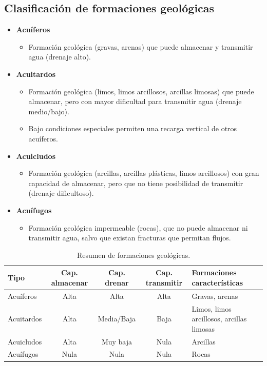 \subsection{Clasificación de formaciones geológicas}
\begin{itemize}
  \item \textbf{Acuíferos}
  \begin{itemize}
    \item Formación geológica (gravas, arenas) que puede almacenar y transmitir
          agua (drenaje alto).
  \end{itemize}
  \item \textbf{Acuitardos}
  \begin{itemize}
    \item Formación geológica (limos, limos arcillosos, arcillas limosas) que
          puede almacenar, pero con mayor dificultad para transmitir agua
          (drenaje medio/bajo).
    \item Bajo condiciones especiales permiten una recarga vertical de otros acuíferos.
  \end{itemize}
  \item \textbf{Acuicludos}
  \begin{itemize}
    \item Formación geológica (arcillas, arcillas plásticas, limos arcillosos)
          con gran capacidad de almacenar, pero que no tiene posibilidad de
          transmitir (drenaje dificultoso).
  \end{itemize}
  \item \textbf{Acuífugos}
  \begin{itemize}
    \item Formación geológica impermeable (rocas), que no puede almacenar ni
          transmitir agua, salvo que existan fracturas que permitan flujos.
  \end{itemize}
\end{itemize}

\begin{table}[H]
\centering
{}
\begin{tabularx}{\textwidth}{l c c c X}
\toprule
\textbf{Tipo} & \textbf{Cap. almacenar} & \textbf{Cap. drenar} &
\textbf{Cap. transmitir} & \textbf{Formaciones características}\\
\midrule
Acuíferos  & Alta & Alta       & Alta & Gravas, arenas\\
Acuitardos & Alta & Media/Baja & Baja & Limos, limos arcillosos, arcillas limosas\\
Acuicludos & Alta & Muy baja   & Nula & Arcillas\\
Acuífugos  & Nula & Nula       & Nula & Rocas\\
\bottomrule
\end{tabularx}
\caption{Resumen de formaciones geológicas.}
\end{table}

